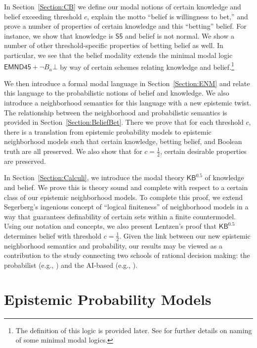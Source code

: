 \documentclass[12pt]{article}
\theoremstyle{definition}
\newcommand{\KBeq}{{\mathsf{KB}^{\mathsf{0.5}}}}       %
\begin{document}
In Section~\ref{Section:CB} we define our modal notions of certain
knowledge and belief exceeding threshold $c$, explain the motto
``belief is willingness to bet,'' and prove a number of properties of
certain knowledge and this ``betting'' belief.  For instance, we show
that knowledge is $\mathsf{S5}$ and belief is not normal.  We show a
number of other threshold-specific properties of betting belief as
well.  In particular, we see that the belief modality extends the
minimal modal logic $\mathsf{EMND45}+\lnot B_a\bot$ by way of certain
schemes relating knowledge and belief.\footnote{The definition of this
  logic is provided later. See \cite[Ch.~8]{Chellas:ml} for further
  details on naming of some minimal modal logics.}

We then introduce a formal modal language in Section~\ref{Section:ENM}
and relate this language to the probabilistic notions of belief and
knowledge.  We also introduce a neighborhood semantics for this
language with a new epistemic twist.  The relationship between the
neighborhood and probabilistic semantics is provided in
Section~\ref{Section:BeliefBet}.  There we prove that for each
threshold $c$, there is a translation from epistemic probability
models to epistemic neighborhood models such that certain knowledge,
betting belief, and Boolean truth are all preserved.  We also show
that for $c=\frac 12$, certain desirable properties are preserved.

In Section~\ref{Section:Calculi}, we introduce the modal theory
$\KBeq$ of knowledge and belief.  We prove this is theory sound and
complete with respect to a certain class of our epistemic neighborhood
models.  To complete this proof, we extend Segerberg's
\cite{Segerberg1971:qpiams} ingenious concept of ``logical
finiteness'' of neighborhood models in a way that guarantees
definability of certain sets within a finite countermodel.  Using our
notation and concepts, we also present Lentzen's proof
\cite{Lenzen1980:gwuw} that $\KBeq$ determines belief with threshold
$c=\frac 12$.  Given the link between our new epistemic neighborhood
semantics and probability, our results may be viewed as a contribution
to the study connecting two schools of rational decision making: the
probabilist (e.g., \cite{koerner2008naive}) and the AI-based (e.g.,
\cite{KyburgTeng2012:tlorkr}).


\section{Epistemic Probability Models}
\label{Section:EPL} 
\end{document}
